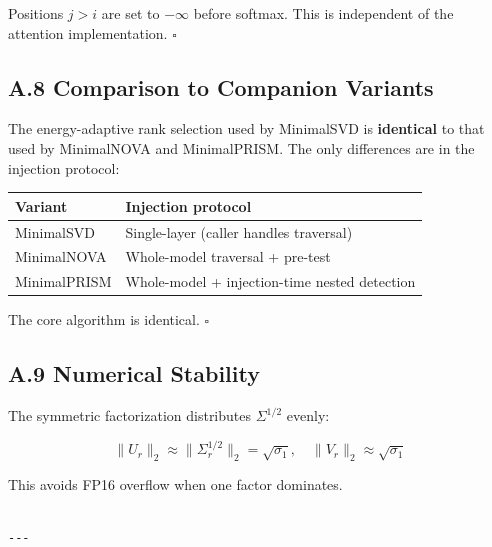 Positions $j > i$ are set to $-\infty$ before softmax. This is independent 
of the attention implementation. $\square$

\subsection{A.8 Comparison to Companion Variants}

The energy-adaptive rank selection used by MinimalSVD is \textbf{identical} to 
that used by MinimalNOVA and MinimalPRISM. The only differences are in the 
injection protocol:

\begin{table}[H]
\centering
\small
\begin{tabular}{ll}
\toprule
\textbf{Variant} & \textbf{Injection protocol} \\
\midrule
MinimalSVD & Single-layer (caller handles traversal) \\
MinimalNOVA & Whole-model traversal + pre-test \\
MinimalPRISM & Whole-model + injection-time nested detection \\
\bottomrule
\end{tabular}
\end{table}

The core algorithm is identical. $\square$

\subsection{A.9 Numerical Stability}

The symmetric factorization distributes $\Sigma^{1/2}$ evenly:

\[
\|U_r\|_2 \approx \|\Sigma_r^{1/2}\|_2 = \sqrt{\sigma_1}, \quad
\|V_r\|_2 \approx \sqrt{\sigma_1}
\tag{A.5}
\]

This avoids FP16 overflow when one factor dominates.
\begin{lstlisting}

---
\end{lstlisting}